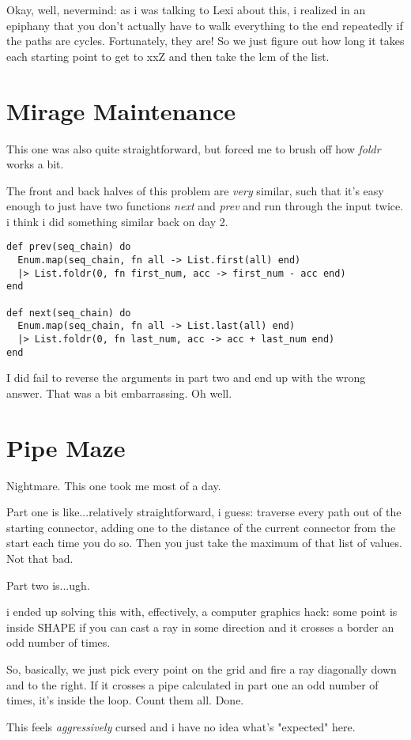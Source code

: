 \documentclass{article}
\begin{document}
Okay, well, nevermind: as i was talking to Lexi about this, i realized in an epiphany that you don't actually have to walk everything to the end repeatedly if the paths are cycles. Fortunately, they are! So we just figure out how long it takes each starting point to get to xxZ and then take the lcm of the list.

\section{Mirage Maintenance}

This one was also quite straightforward, but forced me to brush off how \textit{foldr} works a bit.

The front and back halves of this problem are \textit{very} similar, such that it's easy enough to just have two functions \textit{next} and \textit{prev} and run through the input twice. i think i did something similar back on day 2.

\begin{verbatim}
def prev(seq_chain) do
  Enum.map(seq_chain, fn all -> List.first(all) end)
  |> List.foldr(0, fn first_num, acc -> first_num - acc end)
end

def next(seq_chain) do
  Enum.map(seq_chain, fn all -> List.last(all) end)
  |> List.foldr(0, fn last_num, acc -> acc + last_num end)
end
\end{verbatim}

I did fail to reverse the arguments in part two and end up with the wrong answer. That was a bit embarrassing. Oh well.

\section{Pipe Maze}

Nightmare. This one took me most of a day.

Part one is like...relatively straightforward, i guess: traverse every path out of the starting connector, adding one to the distance of the current connector from the start each time you do so. Then you just take the maximum of that list of values. Not that bad.

Part two is...ugh.

i ended up solving this with, effectively, a computer graphics hack: some point is inside SHAPE if you can cast a ray in some direction and it crosses a border an odd number of times.

So, basically, we just pick every point on the grid and fire a ray diagonally down and to the right. If it crosses a pipe calculated in part one an odd number of times, it's inside the loop. Count them all. Done.

This feels \textit{aggressively} cursed and i have no idea what's "expected" here.
\end{document}
